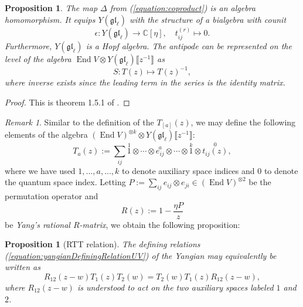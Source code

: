\documentclass[11pt]{report}
\newtheorem{prop}[theorem]{Proposition}
\theoremstyle{definition}
\theoremstyle{remark}
\newtheorem*{remark}{Remark}
\theoremstyle{remark}
\newcommand{\End}{\operatorname{End}}
\newcommand{\C}{\mathbb{C}}
\begin{document}
\begin{prop}
The map $\Delta$ from (\ref{equation:coproduct}) is an algebra homomorphism. It equips $Y(\mathfrak{gl}_\ell)$ with the structure of a bialgebra with counit
\begin{equation*}
\epsilon: Y(\mathfrak{gl}_\ell) \to \C[\eta], \quad t_{ij}^{(r)} \mapsto 0.
\end{equation*}
Furthermore, $Y(\mathfrak{gl}_\ell)$ is a Hopf algebra. The antipode can be represented on the level of the algebra $\End V \otimes Y(\mathfrak{gl}_\ell)\llbracket z^{-1} \rrbracket$ as
\begin{equation*}
S: T(z) \mapsto T(z)^{-1},
\end{equation*}
where inverse exists since the leading term in the series is the identity matrix.
\end{prop}

\begin{proof}
This is theorem 1.5.1 of \cite{book:molev}.
\end{proof}

\begin{remark}
Similar to the definition of the $T_{[a]}(z)$, we may define the following elements of the algebra $(\End V)^{\otimes k} \otimes Y(\mathfrak{gl}_\ell)\llbracket z^{-1} \rrbracket$:
\begin{equation*}
T_a(z) := \sum_{ij} \overset{1}{1} \otimes \cdots \otimes \overset{a}{e_{ij}} \otimes \cdots \otimes \overset{k}{1} \otimes \overset{0}{t_{ij}(z)},
\end{equation*}
where we have used $1,...,a,...,k$ to denote auxiliary space indices and $0$ to denote the quantum space index. Letting $P := \sum_{ij} e_{ij} \otimes e_{ji} \in (\End V)^{\otimes 2}$ be the permutation operator and
\begin{equation*}
R(z) := 1 - \frac{\eta P}{z}
\end{equation*}
be \emph{Yang's rational $R$-matrix}, we obtain the following proposition:
\end{remark}

\begin{prop}[RTT relation]
The defining relations (\ref{equation:yangianDefiningRelationUV}) of the Yangian may equivalently be written as
\begin{equation}\label{equation:RTTRelation}
R_{12}(z-w) T_1(z) T_2(w) = T_2(w) T_1(z) R_{12}(z-w),
\end{equation}
where $R_{12}(z-w)$ is understood to act on the two auxiliary spaces labeled $1$ and $2$.
\end{prop}
\end{document}
